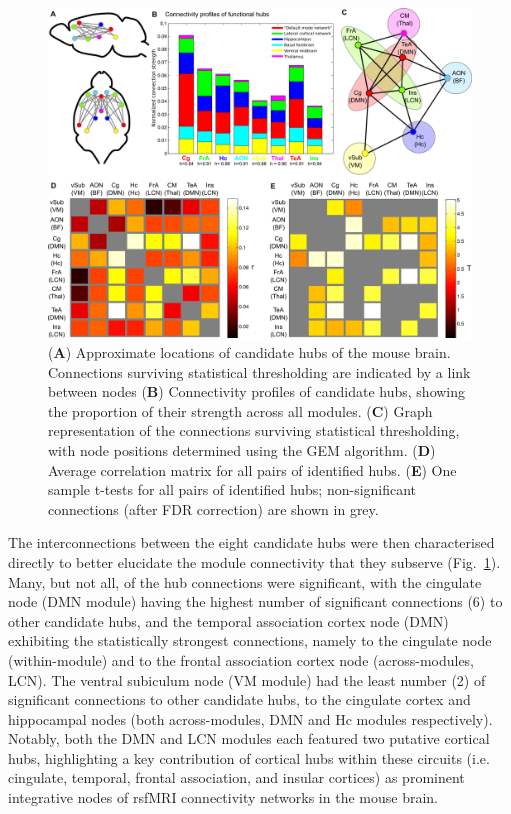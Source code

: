 \begin{figure}[th]
    \centering
    \includegraphics[scale=0.7]{figures/hubs_figure_06_hubs_connections_composite_NEW.png}
    \decoRule
    \caption[Connectivity relationships of candidate hubs.]{(\textbf{A})
    Approximate locations of candidate hubs of the mouse brain. Connections
    surviving statistical thresholding are indicated by a link between nodes
    (\textbf{B}) Connectivity profiles of candidate hubs, showing the proportion
    of their strength across all modules. (\textbf{C}) Graph representation of
    the connections surviving statistical thresholding, with node positions
    determined using the GEM algorithm. (\textbf{D}) Average correlation matrix
    for all pairs of identified hubs. (\textbf{E}) One sample t-tests for all
    pairs of identified hubs; non-significant connections (after FDR correction)
    are shown in grey.}
    \label{fig:hubs_fig6_hub_relationshiops}
\end{figure}


The interconnections between the eight candidate hubs were then characterised
directly to better elucidate the module connectivity that they subserve
(Fig.~\ref{fig:hubs_fig6_hub_relationshiops}). Many, but not all, of the hub
connections were significant, with the cingulate node (DMN module) having the
highest number of significant connections (6) to other candidate hubs, and the
temporal association cortex node (DMN) exhibiting the statistically strongest
connections, namely to the cingulate node (within-module) and to the frontal
association cortex node (across-modules, LCN). The ventral subiculum node (VM
module) had the least number (2) of significant connections to other candidate
hubs, to the cingulate cortex and hippocampal nodes (both across-modules, DMN
and Hc modules respectively).  Notably, both the DMN and LCN modules each
featured two putative cortical hubs, highlighting a key contribution of cortical
hubs within these circuits (i.e.  cingulate, temporal, frontal association, and
insular cortices) as prominent integrative nodes of rsfMRI connectivity networks
in the mouse brain. 

